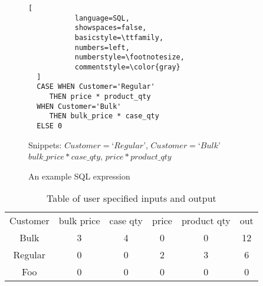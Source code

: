 \begin{figure}
\caption{An example SQL expression}
\label{fig:1}
\begin{lstlisting}[
           language=SQL,
           showspaces=false,
           basicstyle=\ttfamily,
           numbers=left,
           numberstyle=\footnotesize,
           commentstyle=\color{gray}
  ]
  CASE WHEN Customer='Regular'
     THEN price * product_qty
  WHEN Customer='Bulk' 
     THEN bulk_price * case_qty
  ELSE 0
\end{lstlisting}

Snippets: 
$Customer=$`$Regular$', $Customer=$`$Bulk$'
$bulk\_price * case\_qty$, $price * product\_qty$
\end{figure}

\begin{table}[h!]
\centering
\begin{tabular}{ |c|c|c|c|c|c| }
\hline
Customer & bulk price & case qty & price & product qty & out \\
Bulk & 3 & 4 & 0 & 0 & 12 \\
Regular & 0 & 0 & 2 & 3 & 6 \\
Foo & 0 & 0 & 0 & 0 & 0 \\
\hline
\end{tabular}
\caption{Table of user specified inputs and output}
\label{table:1}
\end{table}


